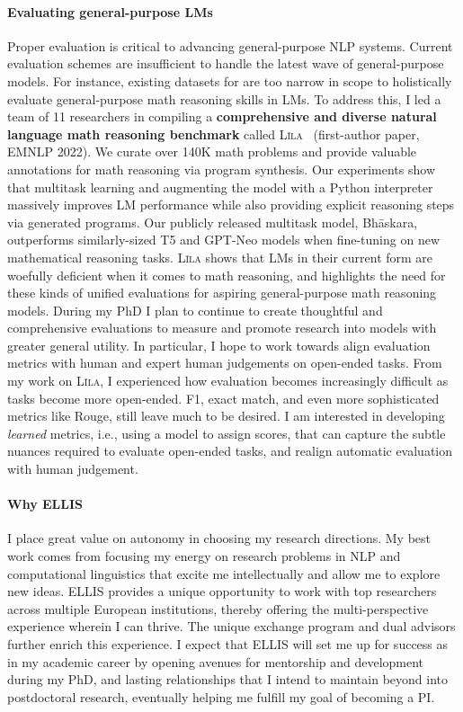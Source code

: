 \documentclass[11pt]{article}
\newcommand\lila{\textsc{L\={\i}la}\xspace}
\newcommand\inst{ELLIS\xspace}
\begin{document}
\paragraph{Evaluating general-purpose LMs}
Proper evaluation is critical to advancing general-purpose NLP systems.
Current evaluation schemes are insufficient to handle
the latest wave of general-purpose models. 
For instance, existing datasets for are too narrow in scope 
to holistically evaluate general-purpose math reasoning skills in LMs.
To address this,
I led a team of 11 researchers in compiling a
\textbf{comprehensive and diverse natural language math reasoning benchmark} 
called \lila~\cite{Mishra2022LilaAU} (first-author paper, EMNLP 2022).
We curate over 140K math problems
and provide valuable annotations for math reasoning via program synthesis. 
Our experiments show that multitask learning 
and augmenting the model with a Python interpreter
massively improves LM performance 
while also providing explicit reasoning steps via generated programs.
Our publicly released multitask model, Bh\=askara, 
outperforms similarly-sized T5 and GPT-Neo models
when fine-tuning on new mathematical reasoning tasks.
\lila shows that LMs 
in their current form 
are woefully deficient when it comes to math reasoning,
and highlights the need for these kinds of unified evaluations for 
aspiring general-purpose math reasoning models.
During my PhD I plan to continue to create thoughtful and comprehensive evaluations 
to measure and promote research into models with greater general utility.
In particular, I hope to work towards align evaluation metrics
with human and expert human judgements on open-ended tasks. 
From my work on \lila, 
I experienced how evaluation becomes increasingly difficult 
as tasks become more open-ended.
F1, exact match, and even more sophisticated metrics like Rouge,
still leave much to be desired.
I am interested in developing \emph{learned} metrics, 
i.e., using a model to assign scores,
that can capture the subtle nuances required to evaluate open-ended tasks,
and realign automatic evaluation with human judgement.

\paragraph{Why \inst}
I place great value on autonomy in choosing my research directions.
My best work comes from focusing my energy on research problems 
in NLP and computational linguistics 
that excite me intellectually and allow me to explore new ideas.
ELLIS provides a unique opportunity to 
work with top researchers across multiple European institutions,
thereby offering the multi-perspective experience wherein I can thrive.
The unique exchange program and dual advisors 
further enrich this experience.
I expect that ELLIS will set me up for success as in my academic career
by opening avenues for mentorship and development
during my PhD, and lasting relationships 
that I intend to maintain beyond into postdoctoral research,  
eventually helping me fulfill my goal of becoming a PI.



\end{document}
